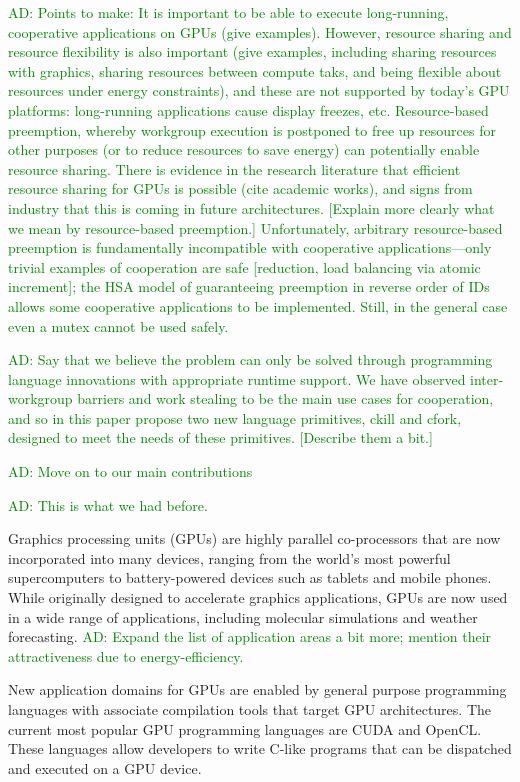 \documentclass[nocopyrightspace]{sigplanconf-pldi16}
\newcommand{\ADComment}[1]{\textcolor{green}{AD: #1}}
\begin{document}
\ADComment{Points to make: It is important to be able to execute
  long-running, cooperative applications on GPUs (give examples).
  However, resource sharing and resource flexibility is also important
  (give examples, including sharing resources with graphics, sharing
  resources between compute taks, and being flexible about resources
  under energy constraints), and these are not supported by today's
  GPU platforms: long-running applications cause display freezes, etc.
  Resource-based preemption, whereby workgroup execution is postponed
  to free up resources for other purposes (or to reduce resources to
  save energy) can potentially enable resource sharing.  There is
  evidence in the research literature that efficient resource sharing
  for GPUs is possible (cite academic works), and signs from industry
  that this is coming in future architectures.  [Explain more clearly
    what we mean by resource-based preemption.]  Unfortunately,
  arbitrary resource-based preemption is fundamentally incompatible
  with cooperative applications---only trivial examples of cooperation
  are safe [reduction, load balancing via atomic increment]; the HSA
  model of guaranteeing preemption in reverse order of IDs allows some
  cooperative applications to be implemented.  Still, in the general
  case even a mutex cannot be used safely.}

\ADComment{Say that we believe the problem can only be solved through
  programming language innovations with appropriate runtime support.
  We have observed inter-workgroup barriers and work stealing to be
  the main use cases for cooperation, and so in this paper propose two
  new language primitives, ckill and cfork, designed to meet the needs
  of these primitives.  [Describe them a bit.]}

\ADComment{Move on to our main contributions}

\ADComment{This is what we had before.}

Graphics processing units (GPUs) are highly parallel co-processors that are now incorporated into many
devices, ranging from the world's most powerful supercomputers to battery-powered devices such as tablets and mobile phones. While
originally designed to accelerate graphics applications, GPUs are now
used in a wide range of applications, including molecular simulations
and weather forecasting. \ADComment{Expand the list of application areas a bit more; mention their attractiveness due to energy-efficiency.}

New application domains for GPUs are enabled by general purpose
programming languages with associate compilation tools that target GPU architectures.
The current most popular GPU programming languages are CUDA and OpenCL. These languages allow developers to
write C-like programs that can be dispatched and executed on a GPU
device.
\end{document}
